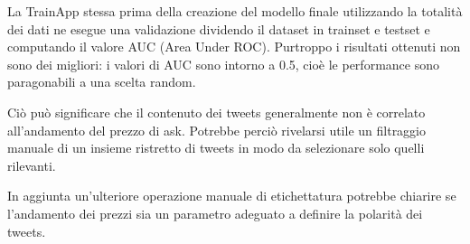 La TrainApp stessa prima della creazione del modello finale utilizzando la totalità dei dati
ne esegue una validazione dividendo il dataset in trainset e testset e computando il valore AUC
(Area Under ROC).
Purtroppo i risultati ottenuti non sono dei migliori: i valori di AUC sono intorno a 0.5, cioè
le performance sono paragonabili a una scelta random.

Ciò può significare che il contenuto dei tweets generalmente non è correlato all'andamento
del prezzo di ask.
Potrebbe perciò rivelarsi utile un
filtraggio manuale di un insieme ristretto di tweets in modo da selezionare solo quelli rilevanti.

In aggiunta un'ulteriore operazione manuale di etichettatura potrebbe chiarire se l'andamento
dei prezzi sia un parametro adeguato a definire la polarità dei tweets.